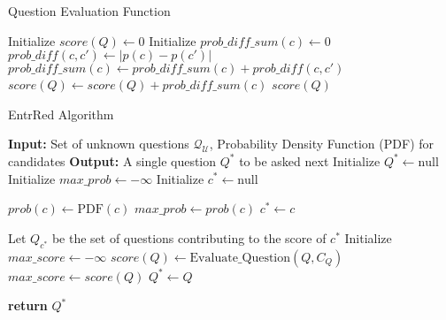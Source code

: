 \begin{algorithm}
\caption{Question Evaluation Function}
\begin{algorithmic}[1]
        \State Initialize $score(Q) \gets 0$
            \State Initialize $prob\_diff\_sum(c) \gets 0$
                \State $prob\_diff(c,c') \gets \left| p(c) - p(c') \right|$
                \State $prob\_diff\_sum(c) \gets prob\_diff\_sum(c) + prob\_diff(c,c')$
            \EndFor
            \State $score(Q) \gets score(Q) + prob\_diff\_sum(c)$
        \EndFor
        \State \Return $score(Q)$
    \EndFunction
\end{algorithmic}
\end{algorithm}

\begin{algorithm}
\caption{EntrRed Algorithm}
\begin{algorithmic}[1]
    \State \textbf{Input:} Set of unknown questions $\mathcal{Q_U}$, Probability Density Function (PDF) for candidates
    \State \textbf{Output:} A single question $Q^*$ to be asked next
    \State Initialize $Q^* \gets \text{null}$
    \State Initialize $max\_prob \gets -\infty$
    \State Initialize $c^* \gets \text{null}$  
    
        \State $prob(c) \gets \text{PDF}(c)$ 
            \State $max\_prob \gets prob(c)$
            \State $c^* \gets c$  
        \EndIf
    \EndFor

    \State Let $Q_{c^*}$ be the set of questions contributing to the score of $c^*$
    \State Initialize $max\_score \gets -\infty$
        \State $score(Q) \gets \text{Evaluate\_Question}(Q, C_Q)$ 
            \State $max\_score \gets score(Q)$
            \State $Q^* \gets Q$  
        \EndIf
    \EndFor
    
    \State \textbf{return} $Q^*$
\end{algorithmic}
\end{algorithm}



